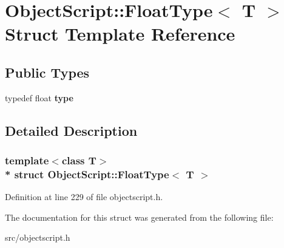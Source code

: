 \hypertarget{struct_object_script_1_1_float_type}{}\section{Object\+Script\+:\+:Float\+Type$<$ T $>$ Struct Template Reference}
\label{struct_object_script_1_1_float_type}
\subsection*{Public Types}
\begin{DoxyCompactItemize}
\item 
typedef float {\bfseries type}\hypertarget{struct_object_script_1_1_float_type_a942779a98107596850b639aae2f4e1cc}{}\label{struct_object_script_1_1_float_type_a942779a98107596850b639aae2f4e1cc}

\end{DoxyCompactItemize}


\subsection{Detailed Description}
\subsubsection*{template$<$class T$>$\\*
struct Object\+Script\+::\+Float\+Type$<$ T $>$}



Definition at line 229 of file objectscript.\+h.



The documentation for this struct was generated from the following file\+:\begin{DoxyCompactItemize}
\item 
src/objectscript.\+h\end{DoxyCompactItemize}

